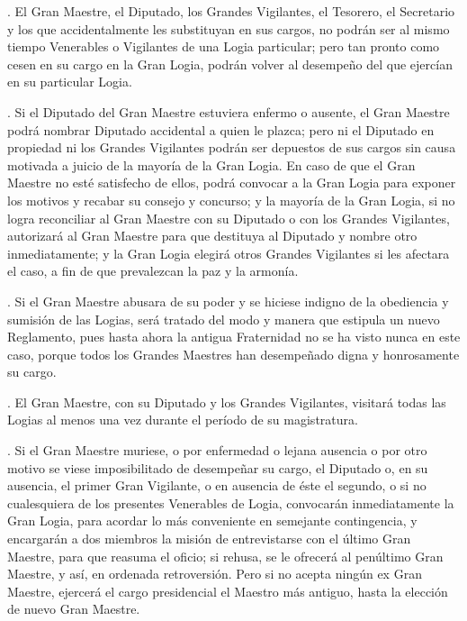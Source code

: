 \documentclass[a4paper,12pt,twoside]{book}
\begin{document}
\vspace{0.3cm}

. El Gran Maestre, el Diputado, los Grandes Vigilantes, el Tesorero, el Secretario y los que accidentalmente les substituyan en sus cargos, no podrán ser al mismo tiempo Venerables o Vigilantes de una Logia particular; pero tan pronto como cesen en su cargo en la Gran Logia, podrán volver al desempeño del que ejercían en su particular Logia.

\vspace{0.3cm}

. Si el Diputado del Gran Maestre estuviera enfermo o ausente, el Gran Maestre podrá nombrar Diputado accidental a quien le plazca; pero ni el Diputado en propiedad ni los Grandes Vigilantes podrán ser depuestos de sus cargos sin causa motivada a juicio de la mayoría de la Gran Logia. En caso de que el Gran Maestre no esté satisfecho de ellos, podrá convocar a la Gran Logia para exponer los motivos y recabar su consejo y concurso; y la mayoría de la Gran Logia, si no logra reconciliar al Gran Maestre con su Diputado o con los Grandes Vigilantes, autorizará al Gran Maestre para que destituya al Diputado y nombre otro inmediatamente; y la Gran Logia elegirá otros Grandes Vigilantes si les afectara el caso, a fin de que prevalezcan la paz y la armonía.

\vspace{0.3cm}

. Si el Gran Maestre abusara de su poder y se hiciese indigno de la obediencia y sumisión de las Logias, será tratado del modo y manera que estipula un nuevo Reglamento, pues hasta ahora la antigua Fraternidad no se ha visto nunca en este caso, porque todos los Grandes Maestres han desempeñado digna y honrosamente su cargo.

\vspace{0.3cm}

. El Gran Maestre, con su Diputado y los Grandes Vigilantes, visitará todas las Logias al menos una vez durante el período de su magistratura.

\vspace{0.3cm}

. Si el Gran Maestre muriese, o por enfermedad o lejana ausencia o por otro motivo se viese imposibilitado de desempeñar su cargo, el Diputado o, en su ausencia, el primer Gran Vigilante, o en ausencia de éste el segundo, o si no cualesquiera de los presentes Venerables de Logia, convocarán inmediatamente la Gran Logia, para acordar lo más conveniente en semejante contingencia, y encargarán a dos miembros la misión de entrevistarse con el último Gran Maestre, para que reasuma el oficio; si rehusa, se le ofrecerá al penúltimo Gran Maestre, y así, en ordenada retroversión. Pero si no acepta ningún ex Gran Maestre, ejercerá el cargo presidencial el Maestro más antiguo, hasta la elección de nuevo Gran Maestre.
\end{document}
